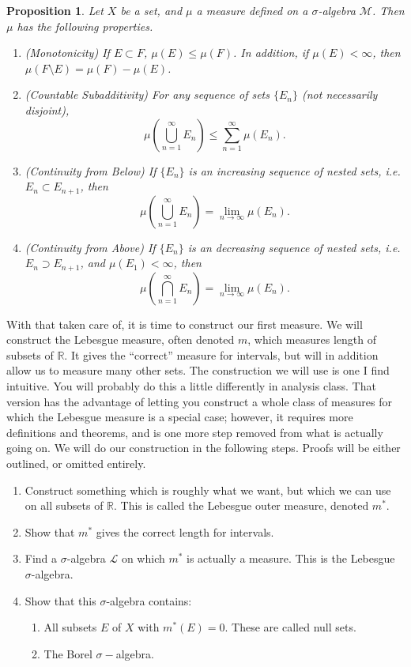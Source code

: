 \documentclass[12pt]{amsart}         %
\newtheorem{proposition}{Proposition}[section]
\theoremstyle{remark}
\newcommand{\R}{\mathbb{R}}
\begin{document}
\begin{proposition}
Let $X$ be a set, and $\mu$ a measure defined on a $\sigma$-algebra $\mathcal{M}$. Then $\mu$ has the following properties.
\begin{enumerate}
    \item (Monotonicity) If $E \subset F$, $\mu(E) \leq \mu(F)$. In addition, if $\mu(E) < \infty$, then $\mu(F\setminus E) = \mu(F) - \mu(E)$.
    \item (Countable Subadditivity) For any sequence of sets $\{E_n\}$ (not necessarily disjoint), 
    \[
    \mu\left( \bigcup_{n=1}^\infty E_n \right) \leq \sum_{n=1}^\infty \mu(E_n).
    \]
    \item (Continuity from Below) If $\{E_n\}$ is an increasing sequence of nested sets, i.e. $E_n \subset E_{n+1}$, then
    \[
    \mu\left( \bigcup_{n=1}^\infty E_n \right) = \lim_{n\rightarrow\infty} \mu(E_n).
    \]
    \item (Continuity from Above) If $\{E_n\}$ is an decreasing sequence of nested sets, i.e. $E_n \supset E_{n+1}$, and $\mu(E_1) < \infty$, then
    \[
    \mu\left( \bigcap_{n=1}^\infty E_n \right) = \lim_{n\rightarrow\infty} \mu(E_n).
    \]
\end{enumerate}
\end{proposition}

With that taken care of, it is time to construct our first measure. We will construct the Lebesgue measure, often denoted $m$, which measures length of subsets of $\R$. It gives the ``correct'' measure for intervals, but will in addition allow us to measure many other sets. The construction we will use is one I find intuitive. You will probably do this a little differently in analysis class. That version has the advantage of letting you construct a whole class of measures for which the Lebesgue measure is a special case; however, it requires more definitions and theorems, and is one more step removed from what is actually going on. We will do our construction in the following steps. Proofs will be either outlined, or omitted entirely.

\begin{enumerate}
    \item Construct something which is roughly what we want, but which we can use on all subsets of $\R$. This is called the Lebesgue outer measure, denoted $m^*$. 
    \item Show that $m^*$ gives the correct length for intervals.
    \item Find a $\sigma$-algebra $\mathcal{L}$ on which $m^*$ is actually a measure. This is the Lebesgue $\sigma$-algebra.
    \item Show that this $\sigma$-algebra contains:
    \begin{enumerate}
        \item All subsets $E$ of $X$ with $m^*(E) = 0$. These are called null sets.
        \item The Borel $\sigma-$algebra.
    \end{enumerate}
\end{enumerate}
\end{document}
